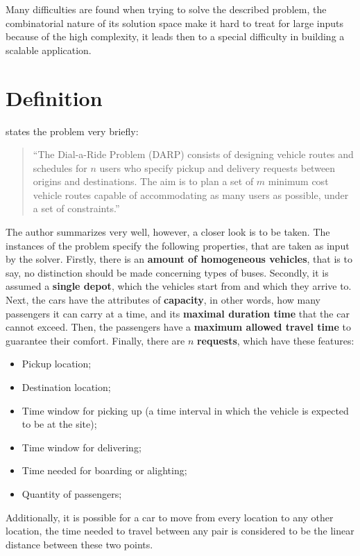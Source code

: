 \documentclass[tuberlin,cic,tc,openright,english,noabntcite,oneside]{iiufrgs}
\begin{document}
Many difficulties are found when trying to solve the described problem, the combinatorial nature of its solution space make it hard to treat for large inputs because of the high complexity, it leads then to a special difficulty in building a scalable application.

\section{Definition}

\textcite[p. 29]{cordeau_dial--ride_2007} states the problem very briefly:
\begin{quote}
\enquote{The Dial-a-Ride Problem (DARP) consists of designing vehicle routes and schedules for $n$ users who specify pickup and delivery requests between origins and destinations. The aim is to plan a set of $m$ minimum cost vehicle routes capable of accommodating as many users as possible, under a set of constraints.}
\end{quote}

The author summarizes very well, however, a closer look is to be taken. The instances of the problem specify the following properties, that are taken as input by the solver. Firstly, there is an \textbf{amount of homogeneous vehicles}, that is to say, no distinction should be made concerning types of buses. Secondly, it is assumed a \textbf{single depot}, which the vehicles start from and which they arrive to. Next, the cars have the attributes of \textbf{capacity}, in other words, how many passengers it can carry at a time, and its \textbf{maximal duration time} that the car cannot exceed. Then, the passengers have a \textbf{maximum allowed travel time} to guarantee their comfort. Finally, there are $n$ \textbf{requests}, which have these features:

\begin{itemize}
\item Pickup location;
\item Destination location;
\item Time window for picking up (a time interval in which the vehicle is expected to be at the site);
\item Time window for delivering;
\item Time needed for boarding or alighting;
\item Quantity of passengers;
\end{itemize}

Additionally, it is possible for a car to move from every location to any other location, the time needed to travel between any pair is considered to be the linear distance between these two points.
\end{document}
